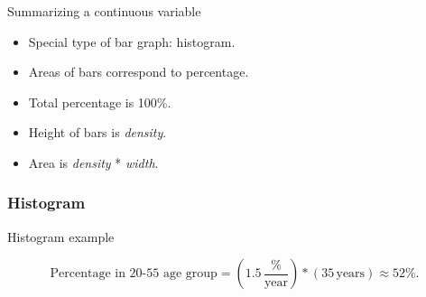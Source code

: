 \documentclass[handout]{beamer}
\begin{document}

   \begin{frame} 

   \begin{block}
   {Summarizing a continuous variable}
   \begin{itemize}

   \item Special type of bar graph: histogram.
   \item Areas of bars correspond to percentage.
   \item Total percentage is 100\%.
   \item Height of bars is {\em density}.
   \item Area is {\em density} * {\em width}.
   \end{itemize}
   \end{block}
   \end{frame}



   \begin{frame}
   \frametitle{Histogram}
   \begin{center}
   \end{center}

   \end{frame}


   \begin{frame} 

   \begin{block}
   {Histogram example}

   $$
   \text{Percentage in 20-55 age group} = \left(1.5 \, \frac{\%}{\text{year}} \right) * \left( 35 \, \text{years} \right) \approx 52 \%.
   $$

   \end{block}
   \end{frame}
\end{document}
